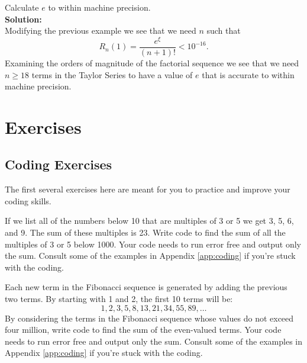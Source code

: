 \begin{example}
    Calculate $e$ to within machine precision. \\{\bf Solution:}\\
    Modifying the previous example we see that we need $n$ such that 
    \[ R_n(1) = \frac{e^\xi}{(n+1)!} < 10^{-16}. \]
    Examining the orders of magnitude of the factorial sequence we see that we need $n \ge
    18$ terms in the Taylor Series to have a value of $e$ that is accurate to within
    machine precision.
\end{example}


\newpage\section{Exercises}

\subsection{Coding Exercises}
The first several exercises here are meant for you to practice and improve your coding
skills.  

\begin{problem}
    If we list all of the numbers below 10 that are multiples of 3 or 5 we get 3, 5, 6,
    and 9.  The sum of these multiples is 23.  Write code to find the sum of all the
    multiples of 3 or 5 below 1000.  Your code needs to run error free and output only the
    sum.  Consult some of the examples in Appendix \ref{app:coding} if you're stuck with
    the coding.
\end{problem}


\begin{problem}
    Each new term in the Fibonacci sequence is generated by adding the previous two terms.
    By starting with 1 and 2, the first 10 terms will be:
    \[ 1, 2, 3, 5, 8, 13, 21, 34, 55, 89, \dots \]
    By considering the terms in the Fibonacci sequence whose values do not exceed four
    million, write code to find the sum of the even-valued terms. Your code needs to run
    error free and output only the sum.  Consult some of the examples in Appendix
    \ref{app:coding} if you're stuck with
    the coding.
\end{problem}


